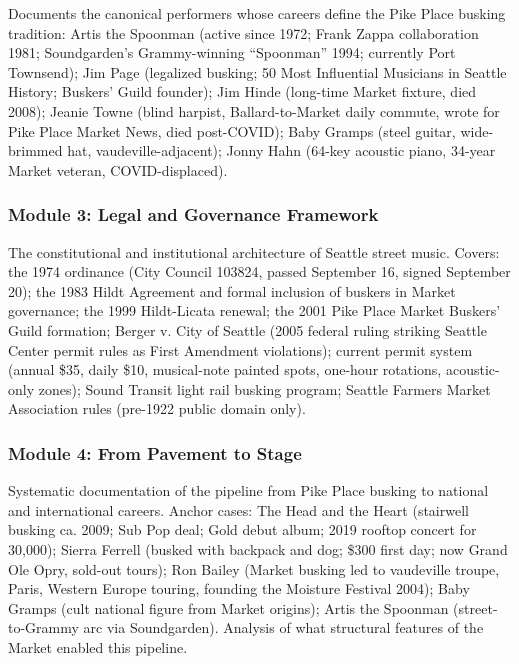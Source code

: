 \documentclass[11pt,letterpaper]{article}
\begin{document}
Documents the canonical performers whose careers define the Pike Place busking tradition: Artis the Spoonman (active since 1972; Frank Zappa collaboration 1981; Soundgarden's Grammy-winning ``Spoonman'' 1994; currently Port Townsend); Jim Page (legalized busking; 50 Most Influential Musicians in Seattle History; Buskers' Guild founder); Jim Hinde (long-time Market fixture, died 2008); Jeanie Towne (blind harpist, Ballard-to-Market daily commute, wrote for Pike Place Market News, died post-COVID); Baby Gramps (steel guitar, wide-brimmed hat, vaudeville-adjacent); Jonny Hahn (64-key acoustic piano, 34-year Market veteran, COVID-displaced).

\subsubsection{Module 3: Legal and Governance Framework}

The constitutional and institutional architecture of Seattle street music. Covers: the 1974 ordinance (City Council 103824, passed September 16, signed September 20); the 1983 Hildt Agreement and formal inclusion of buskers in Market governance; the 1999 Hildt-Licata renewal; the 2001 Pike Place Market Buskers' Guild formation; Berger v. City of Seattle (2005 federal ruling striking Seattle Center permit rules as First Amendment violations); current permit system (annual \$35, daily \$10, musical-note painted spots, one-hour rotations, acoustic-only zones); Sound Transit light rail busking program; Seattle Farmers Market Association rules (pre-1922 public domain only).

\subsubsection{Module 4: From Pavement to Stage}

Systematic documentation of the pipeline from Pike Place busking to national and international careers. Anchor cases: The Head and the Heart (stairwell busking ca. 2009; Sub Pop deal; Gold debut album; 2019 rooftop concert for 30,000); Sierra Ferrell (busked with backpack and dog; \$300 first day; now Grand Ole Opry, sold-out tours); Ron Bailey (Market busking led to vaudeville troupe, Paris, Western Europe touring, founding the Moisture Festival 2004); Baby Gramps (cult national figure from Market origins); Artis the Spoonman (street-to-Grammy arc via Soundgarden). Analysis of what structural features of the Market enabled this pipeline.
\end{document}
